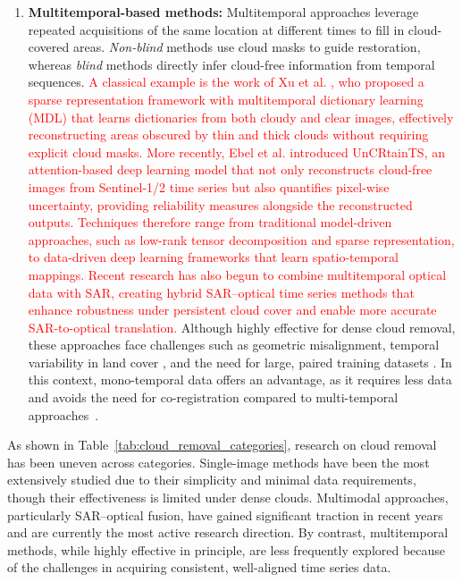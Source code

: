 \begin{enumerate}[label=(\Alph*)]
  \item \textbf{Multitemporal-based methods:} Multitemporal approaches leverage repeated acquisitions of the same location at different times to fill in cloud-covered areas. \textit{Non-blind} methods use cloud masks to guide restoration, whereas \textit{blind} methods directly infer cloud-free information from temporal sequences. \textcolor{red}{A classical example is the work of Xu et al. \cite{CR_spars_repre_MT_dict_L}, who proposed a sparse representation framework with multitemporal dictionary learning (MDL) that learns dictionaries from both cloudy and clear images, effectively reconstructing areas obscured by thin and thick clouds without requiring explicit cloud masks. More recently, Ebel et al. \cite{UnCRtainTS} introduced UnCRtainTS, an attention-based deep learning model that not only reconstructs cloud-free images from Sentinel-1/2 time series but also quantifies pixel-wise uncertainty, providing reliability measures alongside the reconstructed outputs. Techniques therefore range from traditional model-driven approaches, such as low-rank tensor decomposition and sparse representation, to data-driven deep learning frameworks that learn spatio-temporal mappings. Recent research has also begun to combine multitemporal optical data with SAR, creating hybrid SAR–optical time series methods that enhance robustness under persistent cloud cover and enable more accurate SAR-to-optical translation.} Although highly effective for dense cloud removal, these approaches face challenges such as geometric misalignment, temporal variability in land cover \cite{expl_ML_CR_Cameroon}, and the need for large, paired training datasets \cite{CR_Advances_Review_ORS}. In this context, mono-temporal data offers an advantage, as it requires less data and avoids the need for co-registration compared to multi-temporal approaches~\cite{kiwa_auto_Delineation_BAs}.
\end{enumerate}

As shown in Table~\ref{tab:cloud_removal_categories}, research on cloud removal has been uneven across categories. Single-image methods have been the most extensively studied due to their simplicity and minimal data requirements, though their effectiveness is limited under dense clouds. Multimodal approaches, particularly SAR–optical fusion, have gained significant traction in recent years and are currently the most active research direction. By contrast, multitemporal methods, while highly effective in principle, are less frequently explored because of the challenges in acquiring consistent, well-aligned time series data.

